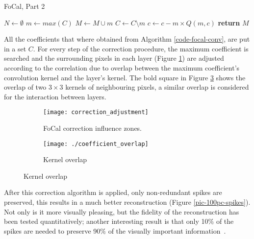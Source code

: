 \begin{algorithm}[htb]
  \caption{FoCal, Part 2}
  \label{code-focal-corr}
  \begin{algorithmic}
    \State $N \leftarrow \emptyset$ 
    \Repeat
    \State $m \leftarrow max(C)$
    \State $M \leftarrow M \cup m$
    \State $C \leftarrow C \setminus m$
     
     
    \State $c \leftarrow c - m \times Q(m, c)$
    \EndIf
    \EndFor
    \State \textbf{return} $M$
    \EndProcedure
  \end{algorithmic}
\end{algorithm}

All the coefficients that where obtained from Algorithm \ref{code-focal-conv}, are put in a set $C$. For every step of the correction procedure, the maximum coefficient is searched and the surrounding pixels in each layer (Figure \ref{fig:focal2}) are adjusted according to the correlation due to overlap between the maximum coefficient's convolution kernel and the layer's kernel. The bold square in Figure \ref{fig:overlap} shows the overlap of two $3\times3$ kernels of neighbouring pixels, a similar overlap is considered for the interaction between layers.

\begin{figure}[htb]
  \centering
  \begin{subfigure}[t]{0.68\textwidth}
  \texttt{[image: correction\_adjustment]}
  \caption{FoCal correction influence zones.}
  \label{fig:focal2}
  \end{subfigure}
  \hfill
  \begin{subfigure}[t]{0.29\textwidth}
  \texttt{[image: ./coefficient\_overlap]}
  \caption{Kernel overlap}
  \label{fig:overlap}
  \end{subfigure}
\end{figure}

After this correction algorithm is applied, only non-redundant spikes are preserved, this results in a much better reconstruction (Figure \ref{pic-100pc-spikes}). Not only is it more visually pleasing, but the fidelity of the reconstruction has been tested quantitatively; another interesting result is that only 10\% of the spikes are needed to preserve 90\% of the visually important information~\cite{basab-thesis}.

